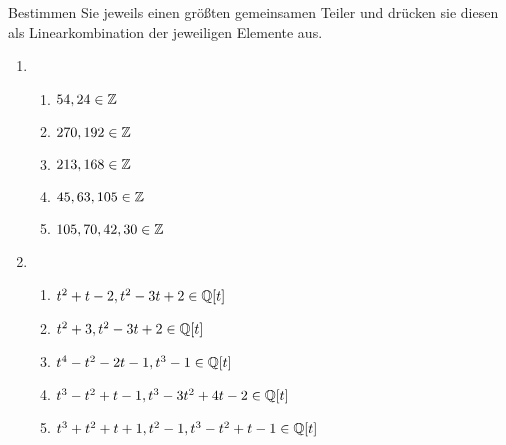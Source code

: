 \begin{question}[subtitle = Größte gemeinsame Teiler]
  Bestimmen Sie jeweils einen größten gemeinsamen Teiler und drücken sie diesen als Linearkombination der jeweiligen Elemente aus.
  \begin{enumerate}
    \item
      \begin{enumerate}
        \item
          $54, 24 \in \mathbb{Z}$
        \item
          $270, 192 \in \mathbb{Z}$
        \item
          $213, 168 \in \mathbb{Z}$
        \item
          $45, 63, 105 \in \mathbb{Z}$
        \item
          $105, 70, 42, 30 \in \mathbb{Z}$
      \end{enumerate}
    \item
      \begin{enumerate}
        \item
          $t^2 + t - 2, t^2 - 3 t + 2 \in \mathbb{Q}[t]$
        \item
          $t^2 + 3, t^2 - 3 t + 2 \in \mathbb{Q}[t]$
        \item
          $t^4 - t^2 - 2 t - 1, t^3 - 1 \in \mathbb{Q}[t]$
        \item
          $t^3 - t^2 + t - 1, t^3 - 3 t^2 + 4 t - 2 \in \mathbb{Q}[t]$
        \item
          $t^3 + t^2 + t + 1, t^2 - 1, t^3 - t^2 + t - 1 \in \mathbb{Q}[t]$
      \end{enumerate}
  \end{enumerate}
\end{question}


